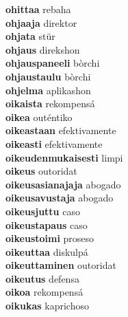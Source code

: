 \textbf{ohittaa } rebaha \\
\textbf{ohjaaja } direktor \\
\textbf{ohjata } stür \\
\textbf{ohjaus } direkshon \\
\textbf{ohjauspaneeli } bòrchi \\
\textbf{ohjaustaulu } bòrchi \\
\textbf{ohjelma } aplikashon \\
\textbf{oikaista } rekompensá \\
\textbf{oikea } outéntiko \\
\textbf{oikeastaan } efektivamente \\
\textbf{oikeasti } efektivamente \\
\textbf{oikeudenmukaisesti } limpi \\
\textbf{oikeus } outoridat \\
\textbf{oikeusasianajaja } abogado \\
\textbf{oikeusavustaja } abogado \\
\textbf{oikeusjuttu } caso \\
\textbf{oikeustapaus } caso \\
\textbf{oikeustoimi } proseso \\
\textbf{oikeuttaa } diskulpá \\
\textbf{oikeuttaminen } outoridat \\
\textbf{oikeutus } defensa \\
\textbf{oikoa } rekompensá \\
\textbf{oikukas } kaprichoso \\
